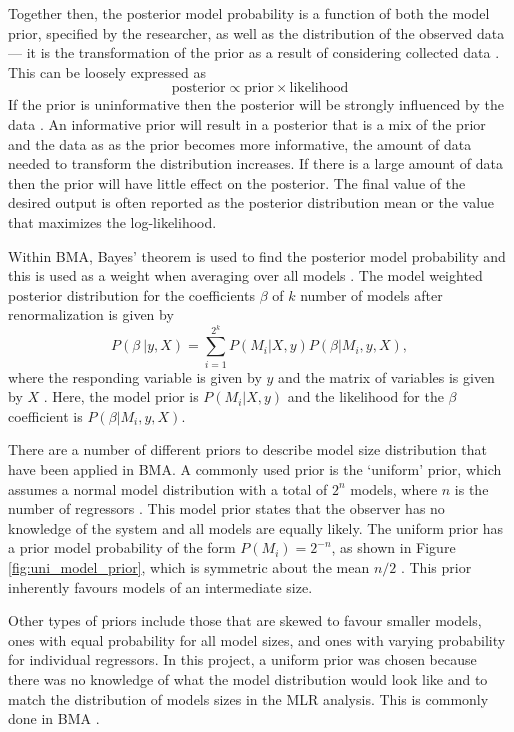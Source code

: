 \documentclass[12pt]{article}
\begin{document}
Together then, the posterior model probability is a function of both the model prior, specified by the researcher, as well as the distribution of the observed data --- it is the transformation of the prior as a result of considering collected data \citep{Wasserman2000}. This can be loosely expressed as
\begin{equation}
\textrm{posterior} \propto \textrm{prior} \times \textrm{likelihood}
\end{equation}
If the prior is uninformative then the posterior will be strongly influenced by the data \citep{Wasserman2000}. An informative prior will result in a posterior that is a mix of the prior and the data as as the prior becomes more informative, the amount of data needed to transform the distribution increases. If there is a large amount of data then the prior will have little effect on the posterior. The final value of the desired output is often reported as the posterior distribution mean or the value that maximizes the log-likelihood. 

Within BMA, Bayes' theorem is used to find the posterior model probability and this is used as a weight when averaging over all models \citep{Wasserman2000}. The model weighted posterior distribution for the coefficients $\beta$ of $k$ number of models after renormalization is given by 
\begin{equation}
P(\beta\ | y,X) = \sum\limits_{i=1}^{2^k} P(M_i | X,y)P(\beta | M_i , y, X),
\end{equation}
where the responding variable is given by $y$ and the matrix of variables is given by $X$ \citep{Raftery1997}. Here, the model prior is $P(M_i | X,y)$ and the likelihood for the $\beta$ coefficient is $P(\beta | M_i , y, X)$.

There are a number of different priors to describe model size distribution that have been applied in BMA. A commonly used prior is the `uniform' prior, which assumes a normal model distribution with a total of $2^n$ models, where $n$ is the number of regressors \citep{Wasserman2000}.  This model prior states that the observer has no knowledge of the system and all models are equally likely. The uniform prior has a prior model probability of the form $P(M_i)=2^{-n}$, as shown in Figure \ref{fig:uni_model_prior}, which is symmetric about the mean $n/2$ \citep{Zeugner2015}. This prior inherently favours models of an intermediate size. 

Other types of priors include those that are skewed to favour smaller models, ones with equal probability for all model sizes, and ones with varying probability for individual regressors. In this project, a uniform prior was chosen because there was no knowledge of what the model distribution would look like and to match the distribution of models sizes in the MLR analysis. This is commonly done in BMA \citep{Wasserman2000}.
\end{document}
